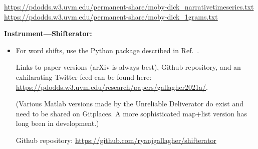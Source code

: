\url{https://pdodds.w3.uvm.edu/permanent-share/moby-dick_narrativetimeseries.txt}\\
\url{https://pdodds.w3.uvm.edu/permanent-share/moby-dick_1grams.txt}

\textbf{Instrument---Shifterator:}

\begin{itemize}
\item 
  For word shifts,
  use the Python package described in Ref.~\cite{gallagher2021a}.

  Links to paper versions (arXiv is always best),
  Github repository,
  and an
  exhilarating Twitter feed
  can be found here: \url{https://pdodds.w3.uvm.edu/research/papers/gallagher2021a/}.

  (Various Matlab versions made by the Unreliable Deliverator do exist
  and need to be shared on Gitplaces.
 A more sophisticated map+list version has long been in development.)

  
  Github repository:
  \url{https://github.com/ryanjgallagher/shifterator}
\end{itemize}



